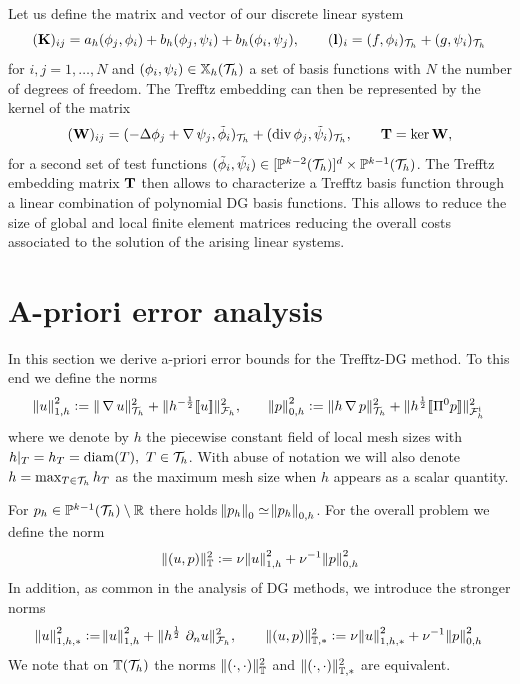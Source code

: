 \documentclass[sn-mathphys,Numbered]{sn-jnl}%
\theoremstyle{remark}%
\theoremstyle{definition}%
\begin{document}
Let us define the matrix and vector of our discrete linear system  
\begin{equation*}\label{def:matrices}
    (\mathbf{K})_{ij}=a_h(\phi_j,\phi_i)+b_h(\phi_j,\psi_i)+b_h(\phi_i,\psi_j),
     \qquad 
    (\mathbf{l})_i = (f,\phi_i)_{\mathcal{T}_h} + (g,\psi_i)_{\mathcal{T}_h}
\end{equation*}
for $i,j = 1,\dots, N$ and $(\phi_i,\psi_i)\in \mathbb{X}_h({\mathcal{T}_h})$ a set of basis functions with $N$ the number of degrees of freedom.
The Trefftz embedding can then be represented by the kernel of the matrix
\begin{equation*}
    (\mathbf{W})_{ij}=(-\Delta \phi_j + \operatorname{\nabla}\psi_j, \tilde\phi_i)_{\mathcal{T}_h} + (\operatorname{\mathrm{div}}\phi_j, \tilde\psi_i)_{\mathcal{T}_h},\qquad \mathbf{T}=\ker\mathbf{W},
\end{equation*}
for a second set of test functions $(\tilde\phi_i, \tilde\psi_i)\in
[\mathbb{P}^{k-2}({\mathcal{T}_h})]^d \times \mathbb{P}^{k-1}({\mathcal{T}_h})$. The Trefftz embedding matrix $\mathbf{T}$
then allows to characterize a Trefftz basis function through a linear
combination of polynomial DG basis functions. This allows to reduce the
size of global and local finite element matrices reducing the overall costs
associated to the solution of the arising linear systems.

\section{A-priori error analysis} \label{sec:analysis}
In this section we derive a-priori error bounds for the Trefftz-DG method.
To this end we define the norms 
\begin{align*}
  \norm{u}_{1,h}^2 := \Vert \operatorname{\nabla} u \Vert_{{\mathcal{T}_h}}^2 +   \Vert  h^{-\frac12} [\![u]\!] \Vert^2_{{\mathcal{F}_h}}, \qquad 
  \norm{p}_{0,h}^2:= \Vert  h \operatorname{\nabla} p \Vert_{{\mathcal{T}_h}}^2 + \Vert  h^\frac12 [\![\Pi^0 p]\!] \Vert_{{\mathcal{F}_h^{\text{i}}}}^2
\end{align*}
where we denote by $h$ the piecewise constant field of local mesh sizes with $h|_T = h_T = \operatorname{diam}(T),~ T \in {\mathcal{T}_h}$. With abuse of notation we will also denote $h = \max_{T\in{\mathcal{T}_h}} h_T$ as the maximum mesh size when $h$ appears as a scalar quantity.

For $p_h \in \mathbb{P}^{k-1}({\mathcal{T}_h}) \setminus \mathbb{R}$ there holds $\norm{p_h}_0 \simeq \norm{p_h}_{0,h}$.
For the overall problem we define the norm
\begin{align*}
  \Vert (u,p) \Vert_{\mathbb{T}}^2 := \nu \norm{u}_{1,h}^2 + \nu^{-1} \norm{p}_{0,h}^2 
\end{align*}
In addition, as common in the analysis of DG methods, we introduce the stronger norms
\begin{align*}
  \norm{u}_{1,h,\ast}^2 := \norm{u}_{1,h}^2 + \nrm{ h^{\frac12} \ \partial_n u}^2_{\Fh}, \qquad 
  \nrm{(u,p)}_{\TT,\ast}^2 := \nu \norm{u}_{1,h,\ast}^2 + \nu^{-1} \norm{p}_{0,h}^2   
\end{align*}
We note that on $\mathbb{T}({\mathcal{T}_h})$  the norms $\Vert (\cdot,\cdot) \Vert_{\mathbb{T}}^2$ and $\Vert (\cdot,\cdot) \Vert_{\mathbb{T},\ast}^2$ are equivalent.
\end{document}
